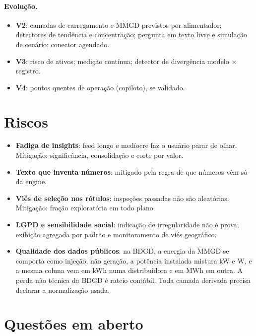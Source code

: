 \documentclass[11pt,a4paper]{article}
\begin{document}
\paragraph{Evolução.}
\begin{itemize}
  \item \textbf{V2}: camadas de carregamento e MMGD previstos por alimentador;
    detectores de tendência e concentração; pergunta em texto livre e
    simulação de cenário; conector agendado.
  \item \textbf{V3}: risco de ativos; medição contínua; detector de
    divergência modelo × registro.
  \item \textbf{V4}: pontos quentes de operação (copiloto), se validado.
\end{itemize}

\section{Riscos}

\begin{itemize}
  \item \textbf{Fadiga de insights}: feed longo e medíocre faz o usuário
    parar de olhar. Mitigação: significância, consolidação e corte por valor.
  \item \textbf{Texto que inventa números}: mitigado pela regra de que números
    vêm só da engine.
  \item \textbf{Viés de seleção nos rótulos}: inspeções passadas não são
    aleatórias. Mitigação: fração exploratória em todo plano.
  \item \textbf{LGPD e sensibilidade social}: indicação de irregularidade não
    é prova; exibição agregada por padrão e monitoramento de viés geográfico.
  \item \textbf{Qualidade dos dados públicos}: na BDGD, a energia da MMGD
    se comporta como injeção, não geração, a potência instalada mistura kW e
    W, e a mesma coluna vem em kWh numa distribuidora e em MWh em outra. A
    perda não técnica da BDGD é rateio contábil. Toda camada derivada precisa
    declarar a normalização usada.
\end{itemize}

\section{Questões em aberto}
\label{sec:abertas}
\end{document}
